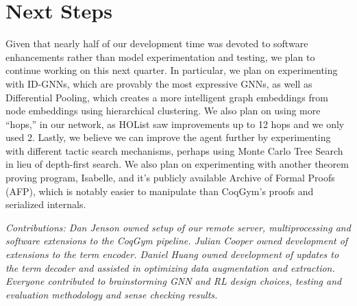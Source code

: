 \documentclass{article}
\begin{document}
\section{Next Steps}
Given that nearly half of our development time was devoted to software enhancements rather than model experimentation and testing, we plan to continue working on this next quarter. In particular, we plan on experimenting with ID-GNNs, which are provably the most expressive GNNs, as well as Differential Pooling, which creates a more intelligent graph embeddings from node embeddings using hierarchical clustering. We also plan on using more ``hops,'' in our network, as HOList saw improvements up to 12 hops and we only used 2. Lastly, we believe we can improve the agent further by experimenting with different tactic search mechanisms, perhaps using Monte Carlo Tree Search in lieu of depth-first search. We also plan on experimenting with another theorem proving program, Isabelle, and it's publicly available Archive of Formal Proofs (AFP), which is notably easier to manipulate than CoqGym's proofs and serialized internals.


\newpage
\textit{Contributions: Dan Jenson owned setup of our remote server, multiprocessing and software extensions to the CoqGym pipeline. Julian Cooper owned development of extensions to the term encoder. Daniel Huang owned development of updates to the term decoder and assisted in optimizing data augmentation and extraction. Everyone contributed to brainstorming GNN and RL design choices, testing and evaluation methodology and sense checking results.}

\printbibliography
\end{document}
